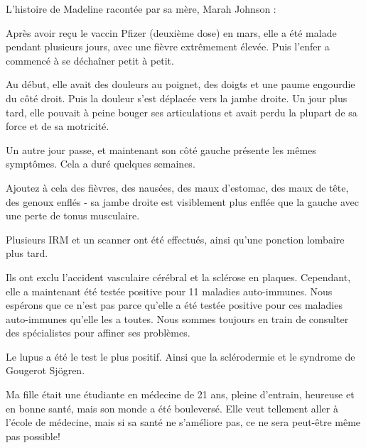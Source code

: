 L'histoire de Madeline racontée par sa mère, Marah Johnson :

Après avoir reçu le vaccin Pfizer (deuxième dose) en mars, elle a été malade
pendant plusieurs jours, avec une fièvre extrêmement élevée. Puis l'enfer a
commencé à se déchaîner petit à petit.

Au début, elle avait des douleurs au poignet, des doigts et une paume engourdie
du côté droit. Puis la douleur s'est déplacée vers la jambe droite. Un jour plus
tard, elle pouvait à peine bouger ses articulations et avait perdu la plupart de
sa force et de sa motricité.

Un autre jour passe, et maintenant son côté gauche présente les mêmes
symptômes. Cela a duré quelques semaines.

Ajoutez à cela des fièvres, des nausées, des maux d'estomac, des maux de tête,
des genoux enflés - sa jambe droite est visiblement plus enflée que la gauche
avec une perte de tonus musculaire.

Plusieurs IRM et un scanner ont été effectués, ainsi qu'une ponction lombaire
plus tard.

Ils ont exclu l'accident vasculaire cérébral et la sclérose en
plaques. Cependant, elle a maintenant été testée positive pour 11 maladies
auto-immunes. Nous espérons que ce n'est pas parce qu'elle a été testée positive
pour ces maladies auto-immunes qu'elle les a toutes. Nous sommes toujours en
train de consulter des spécialistes pour affiner ses problèmes.

Le lupus a été le test le plus positif. Ainsi que la sclérodermie et le syndrome
de Gougerot Sjögren.

Ma fille était une étudiante en médecine de 21 ans, pleine d'entrain, heureuse
et en bonne santé, mais son monde a été bouleversé. Elle veut tellement aller à
l'école de médecine, mais si sa santé ne s'améliore pas, ce ne sera peut-être
même pas possible!


